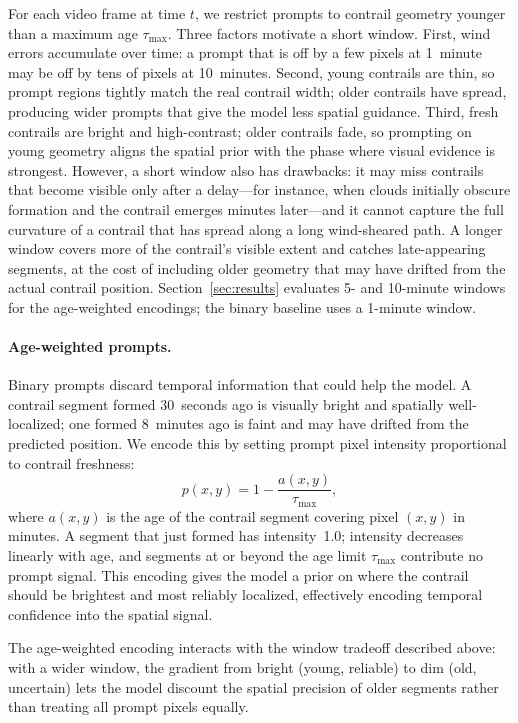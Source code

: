 \documentclass[1p,11pt]{elsarticle}
\begin{document}
For each video frame at time $t$, we restrict prompts to contrail geometry younger than a maximum age $\tau_\text{max}$. Three factors motivate a short window. First, wind errors accumulate over time: a prompt that is off by a few pixels at 1~minute may be off by tens of pixels at 10~minutes. Second, young contrails are thin, so prompt regions tightly match the real contrail width; older contrails have spread, producing wider prompts that give the model less spatial guidance. Third, fresh contrails are bright and high-contrast; older contrails fade, so prompting on young geometry aligns the spatial prior with the phase where visual evidence is strongest. However, a short window also has drawbacks: it may miss contrails that become visible only after a delay---for instance, when clouds initially obscure formation and the contrail emerges minutes later---and it cannot capture the full curvature of a contrail that has spread along a long wind-sheared path. A longer window covers more of the contrail's visible extent and catches late-appearing segments, at the cost of including older geometry that may have drifted from the actual contrail position. Section~\ref{sec:results} evaluates 5- and 10-minute windows for the age-weighted encodings; the binary baseline uses a 1-minute window.

\paragraph{Age-weighted prompts.} Binary prompts discard temporal information that could help the model. A contrail segment formed 30~seconds ago is visually bright and spatially well-localized; one formed 8~minutes ago is faint and may have drifted from the predicted position. We encode this by setting prompt pixel intensity proportional to contrail freshness:
\begin{equation}
    p(x, y) = 1 - \frac{a(x,y)}{\tau_\text{max}},
\label{eq:age_prompt}
\end{equation}
where $a(x,y)$ is the age of the contrail segment covering pixel $(x,y)$ in minutes. A segment that just formed has intensity~1.0; intensity decreases linearly with age, and segments at or beyond the age limit $\tau_\text{max}$ contribute no prompt signal. This encoding gives the model a prior on where the contrail should be brightest and most reliably localized, effectively encoding temporal confidence into the spatial signal.

The age-weighted encoding interacts with the window tradeoff described above: with a wider window, the gradient from bright (young, reliable) to dim (old, uncertain) lets the model discount the spatial precision of older segments rather than treating all prompt pixels equally.
\end{document}
